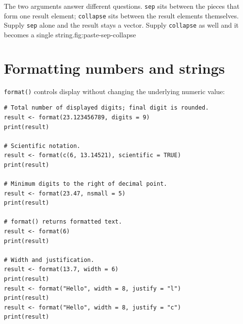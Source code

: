 \begin{utpfig}{The two
arguments answer different questions. \texttt{sep} sits between the pieces that
form one result element; \texttt{collapse} sits between the result elements
themselves. Supply \texttt{sep} alone and the result stays a vector. Supply
\texttt{collapse} as well and it becomes a single string.}{fig:paste-sep-collapse}
\end{utpfig}

\section{Formatting numbers and strings}

\texttt{format()} controls display without changing the underlying numeric value:

\begin{lstlisting}[style=dsr]
# Total number of displayed digits; final digit is rounded.
result <- format(23.123456789, digits = 9)
print(result)

# Scientific notation.
result <- format(c(6, 13.14521), scientific = TRUE)
print(result)

# Minimum digits to the right of decimal point.
result <- format(23.47, nsmall = 5)
print(result)

# format() returns formatted text.
result <- format(6)
print(result)

# Width and justification.
result <- format(13.7, width = 6)
print(result)
result <- format("Hello", width = 8, justify = "l")
print(result)
result <- format("Hello", width = 8, justify = "c")
print(result)
\end{lstlisting}

